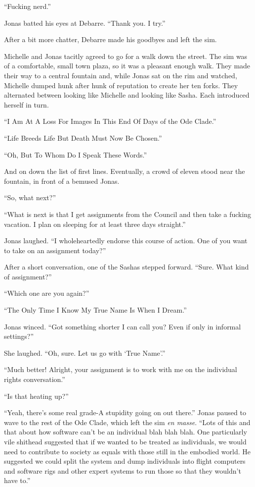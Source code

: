 ``Fucking nerd.''

Jonas batted his eyes at Debarre. ``Thank you. I try.''

After a bit more chatter, Debarre made his goodbyes and left the sim.

Michelle and Jonas tacitly agreed to go for a walk down the street. The sim was of a comfortable, small town plaza, so it was a pleasant enough walk. They made their way to a central fountain and, while Jonas sat on the rim and watched, Michelle dumped hunk after hunk of reputation to create her ten forks. They alternated between looking like Michelle and looking like Sasha. Each introduced herself in turn.

``I Am At A Loss For Images In This End Of Days of the Ode Clade.''

``Life Breeds Life But Death Must Now Be Chosen.''

``Oh, But To Whom Do I Speak These Words.''

And on down the list of first lines. Eventually, a crowd of eleven stood near the fountain, in front of a bemused Jonas.

``So, what next?''

``What is next is that I get assignments from the Council and then take a fucking vacation. I plan on sleeping for at least three days straight.''

Jonas laughed. ``I wholeheartedly endorse this course of action. One of you want to take on an assignment today?''

After a short conversation, one of the Sashas stepped forward. ``Sure. What kind of assignment?''

``Which one are you again?''

``The Only Time I Know My True Name Is When I Dream.''

Jonas winced. ``Got something shorter I can call you? Even if only in informal settings?''

She laughed. ``Oh, sure. Let us go with `True Name'.''

``Much better! Alright, your assignment is to work with me on the individual rights conversation.''

``Is that heating up?''

``Yeah, there's some real grade-A stupidity going on out there.'' Jonas paused to wave to the rest of the Ode Clade, which left the sim \emph{en masse}. ``Lots of this and that about how software can't be an individual blah blah blah. One particularly vile shithead suggested that if we wanted to be treated as individuals, we would need to contribute to society as equals with those still in the embodied world. He suggested we could split the system and dump individuals into flight computers and software rigs and other expert systems to run those so that they wouldn't have to.''

